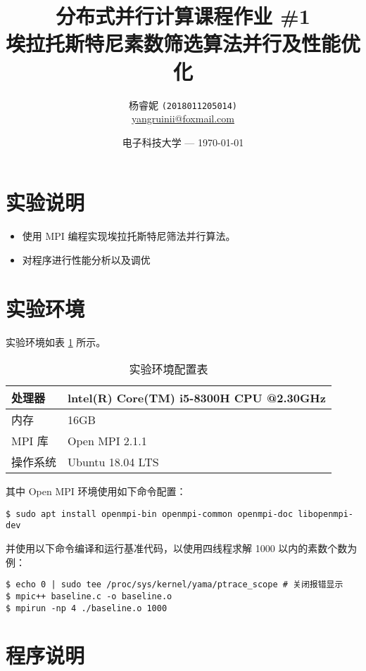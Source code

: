 \documentclass[11pt]{article}
\title{\Large 分布式并行计算课程作业 \#1 \\
  \LARGE 埃拉托斯特尼素数筛选算法并行及性能优化} %
\author{杨睿妮 \texttt{(2018011205014)} \\ \url{yangruinii@foxmail.com}} %
\date{电子科技大学 --- \today} %
\begin{document}
  
  \maketitle %

  \section{实验说明}
  \begin{itemize}
    \item 使用 MPI 编程实现埃拉托斯特尼筛法并行算法。
    \item 对程序进行性能分析以及调优
  \end{itemize}

  \section{实验环境}
  实验环境如表 \ref{tab:env} 所示。
  \begin{table}[h]
    \centering
    \caption{实验环境配置表}
    \label{tab:env}
    \begin{tabular}{ll}
      \hline
      处理器 & lntel(R) Core(TM) i5-8300H CPU @2.30GHz \\
      \hline
      内存 & 16GB \\
      \hline
      MPI 库 & Open MPI 2.1.1\\
      \hline
      操作系统 & Ubuntu 18.04 LTS \\
      \hline
    \end{tabular}
  \end{table}
  
  其中 Open MPI 环境使用如下命令配置：
  \begin{commandline}
    \begin{verbatim}
$ sudo apt install openmpi-bin openmpi-common openmpi-doc libopenmpi-dev
    \end{verbatim}
\end{commandline}

并使用以下命令编译和运行基准代码，以使用四线程求解 1000 以内的素数个数为例：
\begin{commandline}
  \begin{verbatim}
$ echo 0 | sudo tee /proc/sys/kernel/yama/ptrace_scope # 关闭报错显示
$ mpic++ baseline.c -o baseline.o
$ mpirun -np 4 ./baseline.o 1000
  \end{verbatim}
\end{commandline}

  \section{程序说明}
\end{document}
